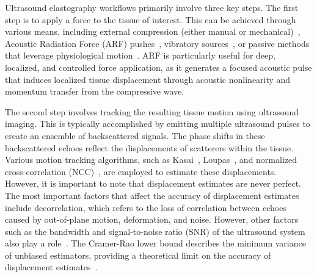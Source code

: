 Ultrasound elastography workflows primarily involve three key steps. The first step is to apply a force to the tissue of interest. This can be achieved through various means, including external compression (either manual or mechanical)~\cite{garra_Elastography_2015,ophir_Elastography_1991}, Acoustic Radiation Force (ARF) pushes~\cite{garra_Elastography_2015,sarvazyan_Shear_1998,nightingale_feasibility_2001}, vibratory sources~\cite{lerner_SonoElasticity_1988,parker_Tissue_1990,sandrin_Transient_2003}, or passive methods that leverage physiological motion~\cite{gallot_Passive_2011,catheline_Tomography_2013,vappou_Pulse_2010}. ARF is particularly useful for deep, localized, and controlled force application, as it generates a focused acoustic pulse that induces localized tissue displacement through acoustic nonlinearity and momentum transfer from the compressive wave.

The second step involves tracking the resulting tissue motion using ultrasound imaging. This is typically accomplished by emitting multiple ultrasound pulses to create an ensemble of backscattered signals. The phase shifts in these backscattered echoes reflect the displacements of scatterers within the tissue. Various motion tracking algorithms, such as Kasai~\cite{kasai_RealTime_1985}, Loupas~\cite{loupas_Experimental_1995}, and normalized cross-correlation (NCC)~\cite{pinton_Rapid_2006}, are employed to estimate these displacements. However, it is important to note that displacement estimates are never perfect. The most important factors that affect the accuracy of displacement estimates include decorrelation, which refers to the loss of correlation between echoes caused by out-of-plane motion, deformation, and noise. However, other factors such as the bandwidth and signal-to-noise ratio (SNR) of the ultrasound system also play a role~\cite{walker_fundamental_1995}. The Cramer-Rao lower bound describes the minimum variance of unbiased estimators, providing a theoretical limit on the accuracy of displacement estimates~\cite{mcaleavey_Estimates_2003,dhanaliwala_Assessing_2012}.

